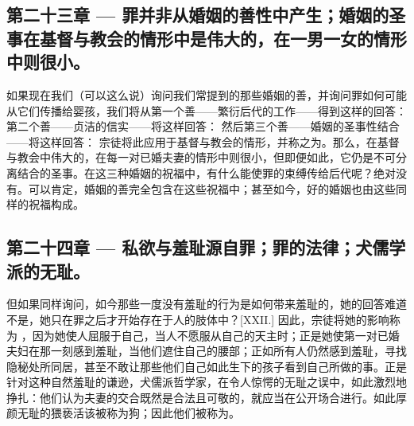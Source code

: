 
\subsection{第二十三章 — 罪并非从婚姻的善性中产生；婚姻的圣事在基督与教会的情形中是伟大的，在一男一女的情形中则很小。}

如果现在我们（可以这么说）询问我们常提到的那些婚姻的善，并询问罪如何可能从它们传播给婴孩，我们将从第一个善——繁衍后代的工作——得到这样的回答： 第二个善——贞洁的信实——将这样回答： 然后第三个善——婚姻的圣事性结合——将这样回答： 宗徒将此应用于基督与教会的情形，并称之为。那么，在基督与教会中伟大的，在每一对已婚夫妻的情形中则很小，但即便如此，它仍是不可分离结合的圣事。在这三种婚姻的祝福中，有什么能使罪的束缚传给后代呢？绝对没有。可以肯定，婚姻的善完全包含在这些祝福中；甚至如今，好的婚姻也由这些同样的祝福构成。\par


\subsection{第二十四章 — 私欲与羞耻源自罪；罪的法律；犬儒学派的无耻。}

但如果同样询问，如今那些一度没有羞耻的行为是如何带来羞耻的，她的回答难道不是，她只在罪之后才开始存在于人的肢体中？[XXII.] 因此，宗徒将她的影响称为 ，因为她使人屈服于自己，当人不愿服从自己的天主时；正是她使第一对已婚夫妇在那一刻感到羞耻，当他们遮住自己的腰部；正如所有人仍然感到羞耻，寻找隐秘处所同居，甚至不敢让那些他们自己如此生下的孩子看到自己所做的事。正是针对这种自然羞耻的谦逊，犬儒派哲学家，在令人惊愕的无耻之误中，如此激烈地挣扎：他们认为夫妻的交合既然是合法且可敬的，就应当在公开场合进行。如此厚颜无耻的猥亵活该被称为狗；因此他们被称为。\par

